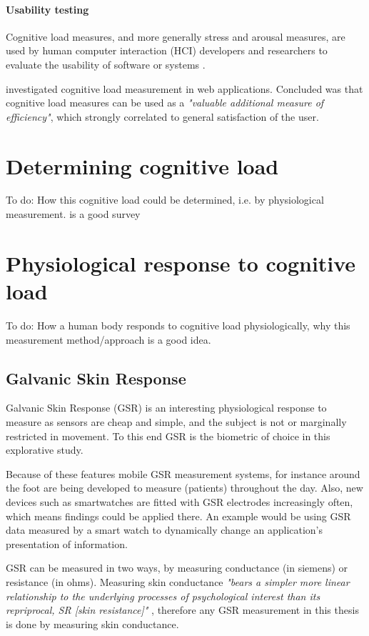 \documentclass[11pt,leqno,a4paper]{report} %
\begin{document}
\paragraph{Usability testing}
Cognitive load measures, and more generally stress and arousal measures, are used by human computer interaction (HCI) developers and researchers to evaluate the usability of software or systems \citep{Jacob2003} \citep{Schmutz2009}.

\citep{Schmutz2009} investigated cognitive load measurement in web applications. Concluded was that cognitive load measures can be used as a \textit{"valuable additional measure of efficiency"}, which strongly correlated to general satisfaction of the user. 

\section{Determining cognitive load}
To do: How this cognitive load could be determined, i.e. by physiological measurement.
\citep{brunken2003direct} is a good survey

\section{Physiological response to cognitive load}
To do: How a human body responds to cognitive load physiologically, why this measurement method/approach is a good idea. 

\subsection{Galvanic Skin Response}

Galvanic Skin Response (GSR) is an interesting physiological response to measure as sensors are cheap and simple, and the subject is not or marginally restricted in movement. To this end GSR is the biometric of choice in this explorative study.

Because of these features mobile GSR measurement systems, for instance around the foot \citep{Gravenhorst} are being developed to measure (patients) throughout the day. Also, new devices such as smartwatches are fitted with GSR electrodes increasingly often, which means findings could be applied there. An example would be using GSR data measured by a smart watch to dynamically change an application's presentation of information.

GSR can be measured in two ways, by measuring conductance (in siemens) or resistance (in ohms). Measuring skin conductance \textit{"bears a simpler more linear relationship to the underlying processes of psychological interest than its repriprocal, SR [skin resistance]"} \citep{lykken1971direct}, therefore any GSR measurement in this thesis is done by measuring skin conductance.
\end{document}

